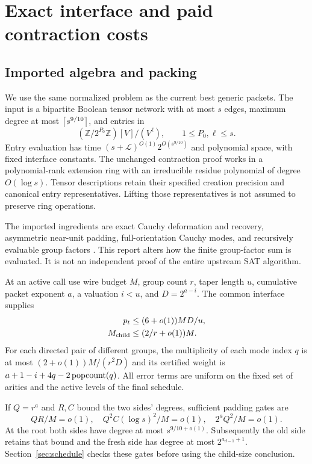 \section{Exact interface and paid contraction costs}
\label{sec:interface}

\subsection{Imported algebra and packing}
We use the same normalized problem as the current best generic packets.
The input is a bipartite Boolean tensor network with at most $s$ edges,
maximum degree at most $\left\lceil s^{9/10}\right\rceil$, and entries in
\[
 (\mathbb Z/2^{P_0}\mathbb Z)[V]/(V^\ell),\qquad 1\le P_0,\ell\le s.
\]
Entry evaluation has time $(s+\mathcal L)^{O(1)}2^{O(s^{9/10})}$ and
polynomial space, with fixed interface constants. The unchanged contraction
proof works in a polynomial-rank extension ring with an irreducible residue
polynomial of degree $O(\log s)$. Tensor descriptions retain their specified
creation precision and canonical entry representatives. Lifting those
representatives is not assumed to preserve ring operations.

The imported ingredients are exact Cauchy deformation and recovery,
asymmetric near-unit padding, full-orientation Cauchy modes, and recursively
evaluable group factors \cite{upstream,asymmetric,joint,portfolio}. This
report alters how the finite group-factor sum is evaluated. It is not an
independent proof of the entire upstream SAT algorithm.

At an active call use wire budget $M$, group count $r$, taper length $u$,
cumulative packet exponent $a$, a valuation $i<u$, and $D=2^{a-i}$.
The common interface supplies
\begin{align}
 p_t&\le(6+o(1))MD/u,\label{eq:working-precision}\\
 M_{\rm child}&\le(2/r+o(1))M.\label{eq:child-size}
\end{align}
For each directed pair of different groups, the multiplicity of each mode
index $q$ is at most $(2+o(1))M/(r^2D)$ and its certified weight is
$a+1-i+4q-2\operatorname{popcount}(q)$. All error terms are uniform on the fixed set of
arities and the active levels of the final schedule.

If $Q=r^a$ and $R,C$ bound the two sides' degrees, sufficient padding gates
are
\begin{equation}\label{eq:packing}
 QR/M=o(1),\quad Q^2C(\log s)^2/M=o(1),\quad 2^aQ^2/M=o(1).
\end{equation}
At the root both sides have degree at most $s^{9/10+o(1)}$. Subsequently
the old side retains that bound and the fresh side has degree at most
$2^{a_{d-1}+1}$. Section~\ref{sec:schedule} checks these gates before
using the child-size conclusion.

